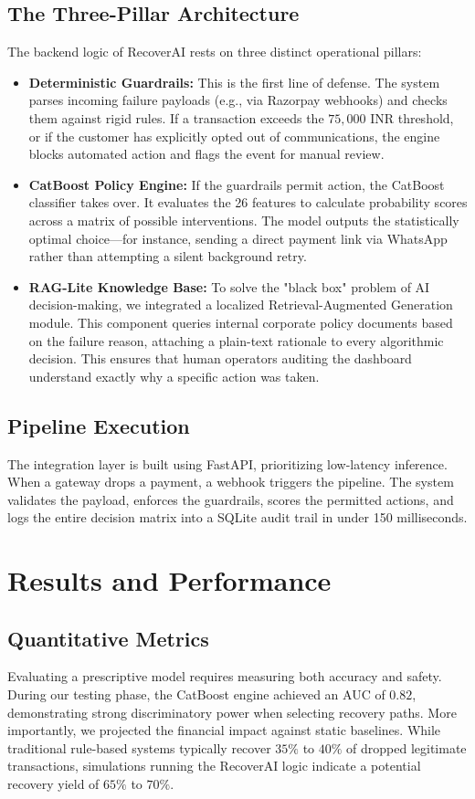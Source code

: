 \documentclass[conference]{IEEEtran}
\begin{document}
\subsection{The Three-Pillar Architecture}
The backend logic of RecoverAI rests on three distinct operational pillars:
\begin{itemize}
    \item \textbf{Deterministic Guardrails:} This is the first line of defense. The system parses incoming failure payloads (e.g., via Razorpay webhooks) and checks them against rigid rules. If a transaction exceeds the $75,000$ INR threshold, or if the customer has explicitly opted out of communications, the engine blocks automated action and flags the event for manual review.
    \item \textbf{CatBoost Policy Engine:} If the guardrails permit action, the CatBoost classifier takes over. It evaluates the 26 features to calculate probability scores across a matrix of possible interventions. The model outputs the statistically optimal choice—for instance, sending a direct payment link via WhatsApp rather than attempting a silent background retry.
    \item \textbf{RAG-Lite Knowledge Base:} To solve the "black box" problem of AI decision-making, we integrated a localized Retrieval-Augmented Generation module. This component queries internal corporate policy documents based on the failure reason, attaching a plain-text rationale to every algorithmic decision. This ensures that human operators auditing the dashboard understand exactly why a specific action was taken.
\end{itemize}

\subsection{Pipeline Execution}
The integration layer is built using FastAPI, prioritizing low-latency inference. When a gateway drops a payment, a webhook triggers the pipeline. The system validates the payload, enforces the guardrails, scores the permitted actions, and logs the entire decision matrix into a SQLite audit trail in under 150 milliseconds.

\section{Results and Performance}

\subsection{Quantitative Metrics}
Evaluating a prescriptive model requires measuring both accuracy and safety. During our testing phase, the CatBoost engine achieved an AUC of $0.82$, demonstrating strong discriminatory power when selecting recovery paths. More importantly, we projected the financial impact against static baselines. While traditional rule-based systems typically recover $35\%$ to $40\%$ of dropped legitimate transactions, simulations running the RecoverAI logic indicate a potential recovery yield of $65\%$ to $70\%$.
\end{document}
